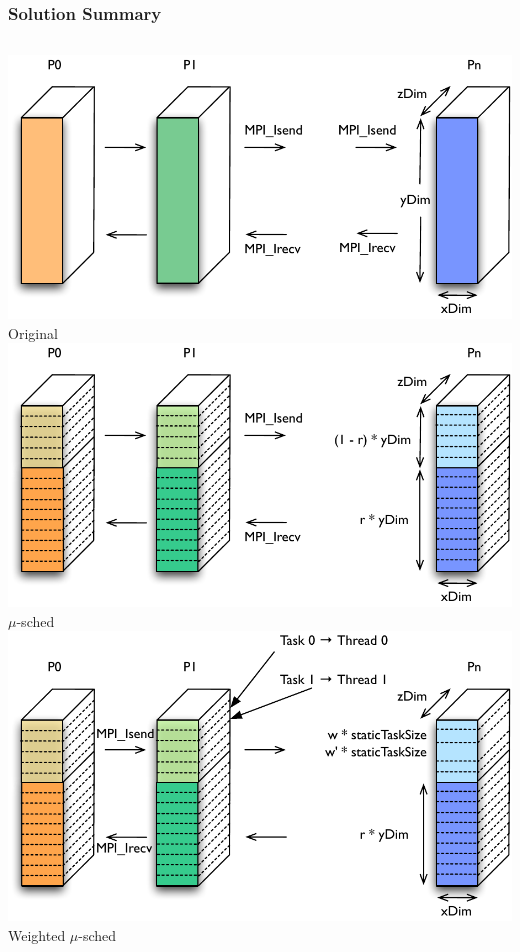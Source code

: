 \begin{frame}  
\frametitle{Solution Summary} 
\begin{columns}
\includegraphics[width=\textwidth]{images/mpi_decomp}
Original 
\includegraphics[width=\textwidth]{images/hybrid_decomp}
$\mu$-sched 
\includegraphics[width=\textwidth]{images/weighted_decomp}
Weighted $\mu$-sched 
\end{columns}
\end{frame}  

